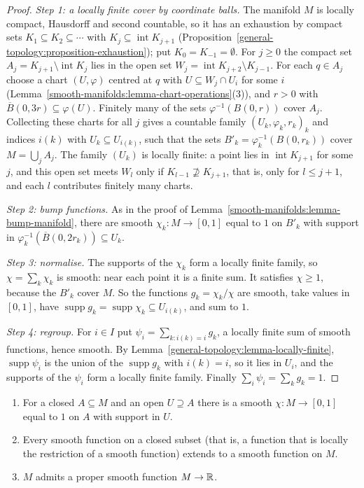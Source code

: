 \begin{proof}
\emph{Step 1: a locally finite cover by coordinate balls.} The manifold $M$ is locally compact, Hausdorff and second countable, so it has an exhaustion by
compact sets $K_1 \subseteq K_2 \subseteq \cdots$ with $K_j \subseteq \operatorname{int}K_{j+1}$ (Proposition~\ref{general-topology:proposition-exhaustion}); put
$K_0 = K_{-1} = \emptyset$. For $j \geq 0$ the compact set $A_j = K_{j+1} \setminus \operatorname{int}K_j$ lies in the open set
$W_j = \operatorname{int}K_{j+2} \setminus K_{j-1}$. For each $q \in A_j$ choose a chart $(U, \varphi)$ centred at $q$ with $U \subseteq W_j \cap U_i$ for some
$i$ (Lemma~\ref{smooth-manifolds:lemma-chart-operations}(3)), and $r > 0$ with $\overline{B}(0, 3r) \subseteq \varphi(U)$. Finitely many of the sets
$\varphi^{-1}(B(0, r))$ cover $A_j$. Collecting these charts for all $j$ gives a countable family $(U_k, \varphi_k, r_k)_k$ and indices $i(k)$ with
$U_k \subseteq U_{i(k)}$, such that the sets $B'_k = \varphi_k^{-1}(B(0, r_k))$ cover $M = \bigcup_jA_j$. The family $(U_k)$ is locally finite: a point lies in
$\operatorname{int}K_{j+1}$ for some $j$, and this open set meets $W_l$ only if $K_{l-1} \not\supseteq K_{j+1}$, that is, only for $l \leq j + 1$, and each $l$
contributes finitely many charts.

\emph{Step 2: bump functions.} As in the proof of Lemma~\ref{smooth-manifolds:lemma-bump-manifold}, there are smooth $\chi_k \colon M \to [0, 1]$ equal to $1$ on
$B'_k$ with support in $\varphi_k^{-1}(\overline{B}(0, 2r_k)) \subseteq U_k$.

\emph{Step 3: normalise.} The supports of the $\chi_k$ form a locally finite family, so $\chi = \sum_k\chi_k$ is smooth: near each point it is a finite sum. It
satisfies $\chi \geq 1$, because the $B'_k$ cover $M$. So the functions $g_k = \chi_k/\chi$ are smooth, take values in $[0, 1]$, have
$\operatorname{supp}g_k = \operatorname{supp}\chi_k \subseteq U_{i(k)}$, and sum to $1$.

\emph{Step 4: regroup.} For $i \in I$ put $\psi_i = \sum_{k : i(k) = i}g_k$, a locally finite sum of smooth functions, hence smooth. By
Lemma~\ref{general-topology:lemma-locally-finite}, $\operatorname{supp}\psi_i$ is the union of the $\operatorname{supp}g_k$ with $i(k) = i$, so it lies in
$U_i$, and the supports of the $\psi_i$ form a locally finite family. Finally $\sum_i\psi_i = \sum_kg_k = 1$.
\end{proof}

\begin{corollary}\label{smooth-manifolds:corollary-partition-applications}
\begin{enumerate}
\item For a closed $A \subseteq M$ and an open $U \supseteq A$ there is a smooth $\chi \colon M \to [0, 1]$ equal to $1$ on $A$ with support in $U$.
\item Every smooth function on a closed subset (that is, a function that is locally the restriction of a smooth function) extends to a smooth function on $M$.
\item $M$ admits a proper smooth function $M \to \mathbb{R}$.
\end{enumerate}
\end{corollary}


